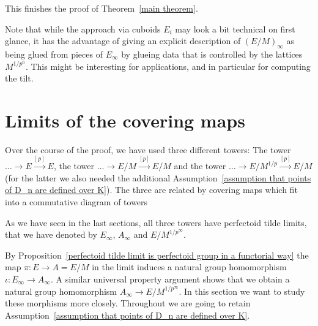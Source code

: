 \documentclass[11pt,oneside]{amsart}
\theoremstyle{definition}
\theoremstyle{remark}
\begin{document}
	This finishes the proof of Theorem~\ref{main theorem}.
	
	Note that while the approach via cuboids $E_i$ may look a bit technical on first glance, it has the advantage of giving an explicit description of $(E/M)_\infty$ as being glued from pieces of $E_\infty$ by glueing data that is controlled by the lattices $M^{1/p^n}$. This might be interesting for applications, and in particular for computing the tilt. 
	
	
	\section{Limits of the covering maps}
	
	Over the course of the proof, we have used three different towers: The tower $\dots \rightarrow E\xrightarrow{[p]} E$, the tower $\dots \rightarrow E/M \xrightarrow{[p]} E/M$ and the tower $\dots \rightarrow E/M^{1/p} \xrightarrow{[p]} E/M$ (for the latter we also needed the additional Assumption~\ref{assumption that points of D_n are defined over K}). The three are related by covering maps which fit into a commutative diagram of towers
	\begin{center}
	\end{center}
	As we have seen in the last sections, all three towers have perfectoid tilde limits, that we have denoted by $E_\infty$, $A_\infty$ and $E/M^{1/p^\infty}$.
	
	By Proposition~\ref{perfectoid tilde limit is perfectoid group in a functorial way} the map $\pi:E\rightarrow A=E/M$ in the limit induces a natural group homomorphism $\iota:E_\infty \rightarrow A_\infty$. A similar universal property argument shows that we obtain a natural group homomorphism $A_\infty \rightarrow E/M^{1/p^\infty}$. In this section we want to study these morphisms more closely. Throughout we are going to retain Assumption~\ref{assumption that points of D_n are defined over K}.
	
\end{document}
